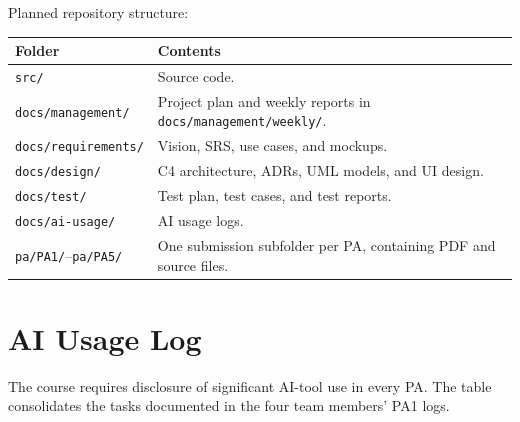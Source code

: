 \documentclass[11pt]{article}
\begin{document}
Planned repository structure:
\begin{center}
\begin{tabular}{@{}L{4.0cm}L{10.5cm}@{}}
\toprule
\textbf{Folder} & \textbf{Contents} \\
\midrule
\texttt{src/} & Source code. \\
\texttt{docs/management/} & Project plan and weekly reports in \texttt{docs/management/weekly/}. \\
\texttt{docs/requirements/} & Vision, SRS, use cases, and mockups. \\
\texttt{docs/design/} & C4 architecture, ADRs, UML models, and UI design. \\
\texttt{docs/test/} & Test plan, test cases, and test reports. \\
\texttt{docs/ai-usage/} & AI usage logs. \\
\texttt{pa/PA1/}--\texttt{pa/PA5/} & One submission subfolder per PA, containing PDF and source files. \\
\bottomrule
\end{tabular}
\end{center}

\section{AI Usage Log}
The course requires disclosure of significant AI-tool use in every PA. The table consolidates the tasks documented in the four team members' PA1 logs.
\end{document}
